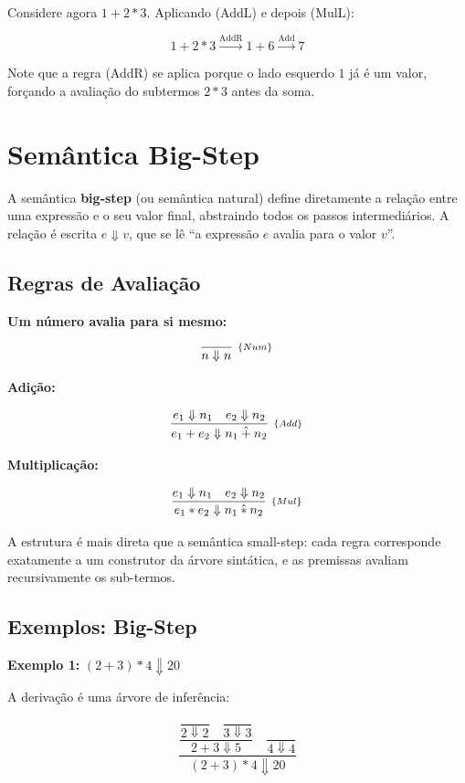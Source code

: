 Considere agora \(1 + 2 * 3\). Aplicando (AddL) e depois (MulL):

\[
  1 + 2 * 3
  \xrightarrow{\text{AddR}} 1 + 6
  \xrightarrow{\text{Add}} 7
\]

Note que a regra (AddR) se aplica porque o lado esquerdo \(1\) já é
um valor, forçando a avaliação do subtermos \(2 * 3\) antes da soma.

\section{Semântica Big-Step}

A semântica \textbf{big-step} (ou semântica natural) define
diretamente a relação entre uma expressão e o seu valor final,
abstraindo todos os passos intermediários. A relação é escrita \(e
\Downarrow v\), que se lê ``a expressão \(e\) avalia para o valor \(v\)''.

\subsection{Regras de Avaliação}

\textbf{Um número avalia para si mesmo:}

\[
  \infer[_{\{Num\}}]{n \Downarrow n}{}
\]

\textbf{Adição:}

\[
  \infer[_{\{Add\}}]{e_1 + e_2 \Downarrow n_1 \mathbin{\hat{+}}
  n_2}{e_1 \Downarrow n_1 & e_2 \Downarrow n_2}
\]

\textbf{Multiplicação:}

\[
  \infer[_{\{Mul\}}]{e_1 * e_2 \Downarrow n_1 \mathbin{\hat{*}}
  n_2}{e_1 \Downarrow n_1 & e_2 \Downarrow n_2}
\]

A estrutura é mais direta que a semântica small-step: cada regra
corresponde exatamente a um construtor da árvore sintática, e as
premissas avaliam recursivamente os sub-termos.

\subsection{Exemplos: Big-Step}

\textbf{Exemplo 1:} \((2 + 3) * 4 \Downarrow 20\)

A derivação é uma árvore de inferência:

\[
  \dfrac{
    \dfrac{
      \dfrac{}{2 \Downarrow 2} \quad \dfrac{}{3 \Downarrow 3}
    }{2 + 3 \Downarrow 5}
    \quad
    \dfrac{}{4 \Downarrow 4}
  }{(2 + 3) * 4 \Downarrow 20}
\]


